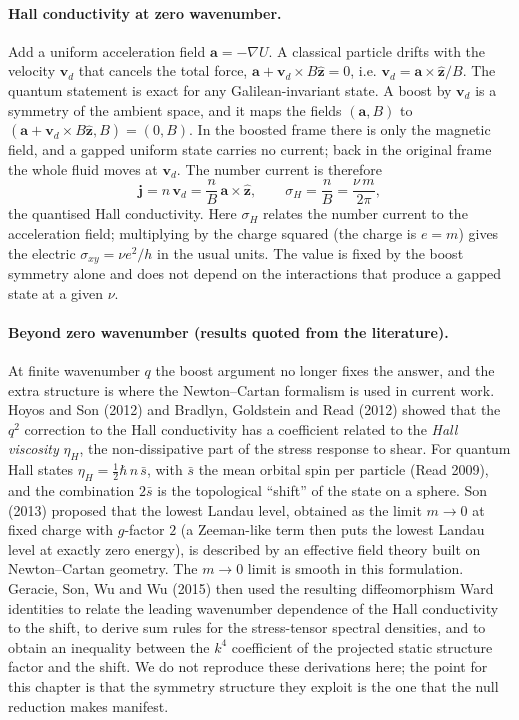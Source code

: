 \paragraph{Hall conductivity at zero wavenumber.}
Add a uniform acceleration field $\mathbf{a}=-\nabla U$. A classical particle
drifts with the velocity $\mathbf{v}_d$ that cancels the total force, $\mathbf{a}+\mathbf{v}_d\times B\hat{\mathbf z}=0$, i.e.
$\mathbf{v}_d=\mathbf{a}\times\hat{\mathbf z}/B$. The quantum statement is exact
for any Galilean-invariant state. A boost by $\mathbf{v}_d$ is a symmetry of the
ambient space, and it maps the fields $(\mathbf{a},B)$ to $(\mathbf{a}+\mathbf{v}_d\times B\hat{\mathbf z},B)=(0,B)$. In the boosted frame there is
only the magnetic field, and a gapped uniform state carries no current;
back in the original frame the whole fluid moves at $\mathbf{v}_d$. The
number current is therefore
\begin{equation}
  \mathbf{j}=n\,\mathbf{v}_d=\frac{n}{B}\,\mathbf{a}\times\hat{\mathbf z},
  \qquad \sigma_H=\frac{n}{B}=\frac{\nu\,m}{2\pi},
  \label{nr:sigmaH}
\end{equation}
the quantised Hall conductivity. Here $\sigma_H$ relates the number current to the
acceleration field; multiplying by the charge squared (the charge is $e=m$)
gives the electric $\sigma_{xy}=\nu e^2/h$ in the usual units. The value is fixed by the boost
symmetry alone and does not depend on the interactions that produce a gapped state
at a given $\nu$.

\paragraph{Beyond zero wavenumber (results quoted from the literature).}
At finite wavenumber $q$ the boost argument no longer fixes the answer, and
the extra structure is where the Newton--Cartan formalism is used in current
work. Hoyos and Son (2012) and Bradlyn, Goldstein and Read (2012) showed that the
$q^2$ correction to the Hall conductivity has a coefficient related to the
\emph{Hall viscosity} $\eta_H$, the non-dissipative part of the stress response
to shear. For quantum Hall states $\eta_H=\tfrac12\hbar\,n\,\bar s$, with $\bar s$ the
mean orbital spin per particle (Read 2009), and the combination $2\bar s$ is
the topological ``shift'' of the state on a sphere. Son (2013) proposed that the
lowest Landau level, obtained as the limit $m\to0$ at fixed charge with
$g$-factor $2$ (a Zeeman-like term then puts the lowest Landau level at exactly zero energy), is described by an effective field theory
built on Newton--Cartan geometry. The $m\to0$ limit is smooth in
this formulation. Geracie, Son, Wu and Wu (2015) then used the resulting
diffeomorphism Ward identities to relate the leading wavenumber dependence of
the Hall conductivity to the shift, to derive sum rules for the stress-tensor
spectral densities, and to obtain an inequality between the $k^4$ coefficient
of the projected static structure factor and the shift. We do not reproduce
these derivations here; the point for this chapter is that the symmetry
structure they exploit is the one that the null reduction makes manifest.

